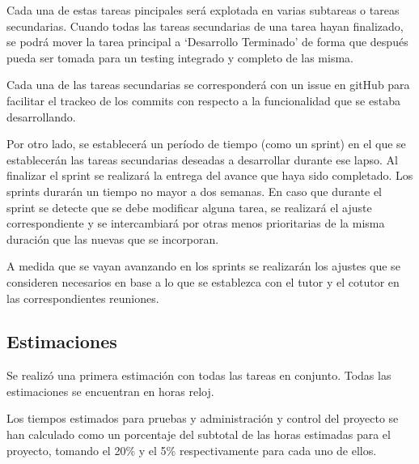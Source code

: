 \documentclass[a4paper]{article}
\begin{document}
Cada una de estas tareas pincipales será explotada en varias subtareas o tareas secundarias. Cuando todas las tareas secundarias de una tarea hayan finalizado, se podrá mover la tarea principal a `Desarrollo Terminado' de forma que después pueda ser tomada para un testing integrado y completo de las misma.

Cada una de las tareas secundarias se corresponderá con un issue en gitHub para facilitar el trackeo de los commits con respecto a la funcionalidad que se estaba desarrollando.

Por otro lado, se establecerá un período de tiempo (como un sprint) en el que se establecerán las tareas secundarias deseadas a desarrollar durante ese lapso. Al finalizar el sprint se realizará la entrega del avance que haya sido completado. Los sprints durarán un tiempo no mayor a dos semanas. En caso que durante el sprint se detecte que se debe modificar alguna tarea, se realizará el ajuste correspondiente y se intercambiará por otras menos prioritarias de la misma duración que las nuevas que se incorporan.

A medida que se vayan avanzando en los sprints se realizarán los ajustes que se consideren necesarios en base a lo que se establezca con el tutor y el cotutor en las correspondientes reuniones.

\subsection{Estimaciones}

Se realizó una primera estimación con todas las tareas en conjunto. Todas las estimaciones se encuentran en horas reloj.

Los tiempos estimados para pruebas y administración y control del proyecto se han calculado como un porcentaje del subtotal de las horas estimadas para el proyecto, tomando el 20\% y el 5\% respectivamente para cada uno de ellos.
\end{document}
